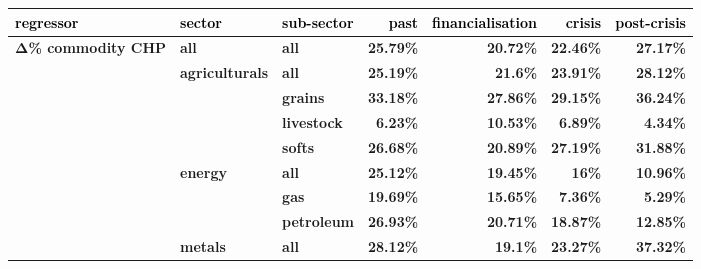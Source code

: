 \documentclass[
  authoryear,
  preprint,
  3p]{elsarticle}
\begin{document}
\begin{longtable}[t]{>{}l>{}l>{}l>{}r>{}r>{}r>{}r}
\toprule
\textcolor{black}{\textbf{regressor}} & \textcolor{black}{\textbf{sector}} & \textcolor{black}{\textbf{sub-sector}} & \textcolor{black}{\textbf{past}} & \textcolor{black}{\textbf{financialisation}} & \textcolor{black}{\textbf{crisis}} & \textcolor{black}{\textbf{post-crisis}}\\
\midrule
\textbf{Δ\% commodity CHP} & \textbf{all} & \textbf{all} & \textcolor[HTML]{4285f4}{\textbf{25.79\%}} & \textcolor[HTML]{4285f4}{\textbf{20.72\%}} & \textcolor[HTML]{4285f4}{\textbf{22.46\%}} & \textcolor[HTML]{4285f4}{\textbf{27.17\%}}\\
\textbf{} & \textbf{agriculturals} & \textbf{all} & \textcolor[HTML]{4285f4}{\textbf{25.19\%}} & \textcolor[HTML]{4285f4}{\textbf{21.6\%}} & \textcolor[HTML]{4285f4}{\textbf{23.91\%}} & \textcolor[HTML]{4285f4}{\textbf{28.12\%}}\\
\textbf{} & \textbf{} & \textbf{grains} & \textcolor[HTML]{4285f4}{\textbf{33.18\%}} & \textcolor[HTML]{4285f4}{\textbf{27.86\%}} & \textcolor[HTML]{4285f4}{\textbf{29.15\%}} & \textcolor[HTML]{4285f4}{\textbf{36.24\%}}\\
\textbf{} & \textbf{} & \textbf{livestock} & \textcolor[HTML]{4285f4}{\textbf{6.23\%}} & \textcolor[HTML]{4285f4}{\textbf{10.53\%}} & \textcolor[HTML]{4285f4}{\textbf{6.89\%}} & \textcolor[HTML]{4285f4}{\textbf{4.34\%}}\\
\textbf{} & \textbf{} & \textbf{softs} & \textcolor[HTML]{4285f4}{\textbf{26.68\%}} & \textcolor[HTML]{4285f4}{\textbf{20.89\%}} & \textcolor[HTML]{4285f4}{\textbf{27.19\%}} & \textcolor[HTML]{4285f4}{\textbf{31.88\%}}\\
\addlinespace
\textbf{} & \textbf{energy} & \textbf{all} & \textcolor[HTML]{4285f4}{\textbf{25.12\%}} & \textcolor[HTML]{4285f4}{\textbf{19.45\%}} & \textcolor[HTML]{4285f4}{\textbf{16\%}} & \textcolor[HTML]{4285f4}{\textbf{10.96\%}}\\
\textbf{} & \textbf{} & \textbf{gas} & \textcolor[HTML]{4285f4}{\textbf{19.69\%}} & \textcolor[HTML]{4285f4}{\textbf{15.65\%}} & \textcolor[HTML]{4285f4}{\textbf{7.36\%}} & \textcolor[HTML]{4285f4}{\textbf{5.29\%}}\\
\textbf{} & \textbf{} & \textbf{petroleum} & \textcolor[HTML]{4285f4}{\textbf{26.93\%}} & \textcolor[HTML]{4285f4}{\textbf{20.71\%}} & \textcolor[HTML]{4285f4}{\textbf{18.87\%}} & \textcolor[HTML]{4285f4}{\textbf{12.85\%}}\\
\textbf{} & \textbf{metals} & \textbf{all} & \textcolor[HTML]{4285f4}{\textbf{28.12\%}} & \textcolor[HTML]{4285f4}{\textbf{19.1\%}} & \textcolor[HTML]{4285f4}{\textbf{23.27\%}} & \textcolor[HTML]{4285f4}{\textbf{37.32\%}}\\

\end{longtable}
\end{document}
